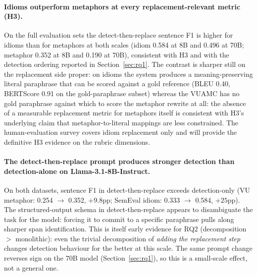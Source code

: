 \paragraph{Idioms outperform metaphors at every replacement-relevant metric (H3).} On the full evaluation sets the detect-then-replace sentence F1 is higher for idioms than for metaphors at both scales (idiom 0.584 at 8B and 0.496 at 70B; metaphor 0.352 at 8B and 0.190 at 70B), consistent with H3 and with the detection ordering reported in Section~\ref{sec:rq1}. The contrast is sharper still on the replacement side proper: on idioms the system produces a meaning-preserving literal paraphrase that can be scored against a gold reference (BLEU 0.40, BERTScore 0.91 on the gold-paraphrase subset) whereas the VUAMC has no gold paraphrase against which to score the metaphor rewrite at all: the absence of a measurable replacement metric for metaphors itself is consistent with H3's underlying claim that metaphor-to-literal mappings are less constrained. The human-evaluation survey covers idiom replacement only and will provide the definitive H3 evidence on the rubric dimensions.

\paragraph{The detect-then-replace prompt produces stronger detection than detection-alone on Llama-3.1-8B-Instruct.} On both datasets, sentence F1 in detect-then-replace exceeds detection-only (VU metaphor: 0.254 $\to$ 0.352, $+9.8$pp; SemEval idiom: 0.333 $\to$ 0.584, $+25$pp). The structured-output schema in detect-then-replace appears to disambiguate the task for the model: forcing it to commit to a specific paraphrase pulls along sharper span identification. This is itself early evidence for RQ2 (decomposition $>$ monolithic): even the trivial decomposition of \emph{adding the replacement step} changes detection behaviour for the better at this scale. The same prompt change reverses sign on the 70B model (Section~\ref{sec:rq1}), so this is a small-scale effect, not a general one.

